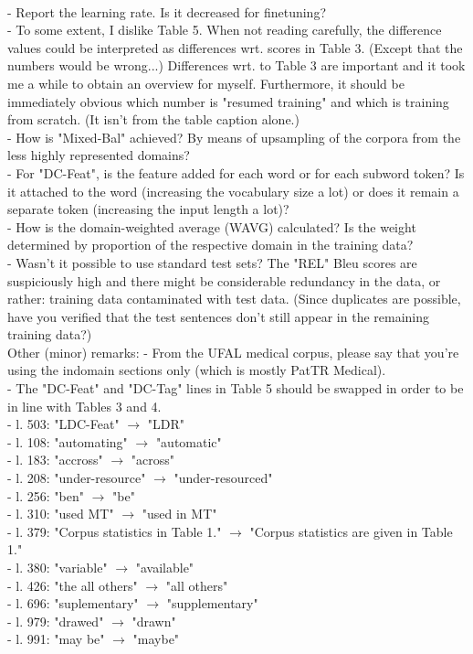 \documentclass[12pt,times,a4paper,twoside]{article}
\theoremstyle{definition}
\begin{document}
\\
- Report the learning rate. Is it decreased for finetuning?
\\
- To some extent, I dislike Table 5. When not reading carefully, the
difference values could be interpreted as differences wrt. scores in Table 3. (Except that the numbers would be wrong...) Differences wrt. to Table 3 are important and it took me a while to obtain an overview for myself. Furthermore, it should be immediately obvious which number is "resumed training" and which is training from scratch. (It isn't from the table caption alone.)
\\
- How is "Mixed-Bal" achieved? By means of upsampling of the corpora from the less highly represented domains?
\\
- For "DC-Feat", is the feature added for each word or for each subword token? Is it attached to the word (increasing the vocabulary size a lot) or does it remain a separate token (increasing the input length a lot)?
\\
- How is the domain-weighted average (WAVG) calculated? Is the weight determined by proportion of the respective domain in the training data?
\\
- Wasn't it possible to use standard test sets? The "REL" Bleu scores are suspiciously high and there might be considerable redundancy in the data, or rather: training data contaminated with test data. (Since duplicates are possible, have you verified that the test sentences don't still appear in the remaining training data?)
\\
Other (minor) remarks:
- From the UFAL medical corpus, please say that you're using the indomain sections only (which is mostly PatTR Medical).
\\
- The "DC-Feat" and "DC-Tag" lines in Table 5 should be swapped in order to be in line with Tables 3 and 4.
\\
- l. 503: "LDC-Feat" $\rightarrow$ "LDR"
\\
- l. 108: "automating" $\rightarrow$ "automatic"
\\
- l. 183: "accross" $\rightarrow$ "across"
\\
- l. 208: "under-resource" $\rightarrow$ "under-resourced"
\\
- l. 256: "ben" $\rightarrow$ "be"
\\
- l. 310: "used MT" $\rightarrow$ "used in MT"
\\
- l. 379: "Corpus statistics in Table 1." $\rightarrow$ "Corpus statistics are given in
Table 1."
\\
- l. 380: "variable" $\rightarrow$ "available"
\\
- l. 426: "the all others" $\rightarrow$ "all others"
\\
- l. 696: "suplementary" $\rightarrow$ "supplementary"
\\
- l. 979: "drawed" $\rightarrow$ "drawn"
\\
- l. 991: "may be" $\rightarrow$ "maybe"
\end{document}
